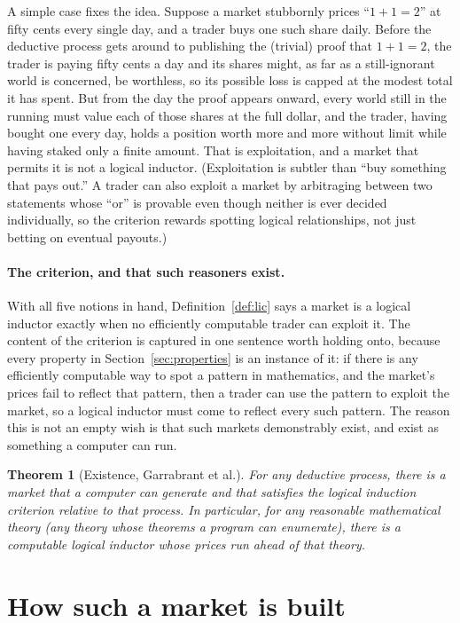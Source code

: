 \documentclass[10pt]{article}
\newtheorem{theorem}{Theorem}[section]
\theoremstyle{definition}
\theoremstyle{remark}
\begin{document}
A simple case fixes the idea. Suppose a market stubbornly prices ``$1+1=2$'' at fifty cents every single day, and a trader buys one such share daily. Before the deductive process gets around to publishing the (trivial) proof that $1+1=2$, the trader is paying fifty cents a day and its shares might, as far as a still-ignorant world is concerned, be worthless, so its possible loss is capped at the modest total it has spent. But from the day the proof appears onward, every world still in the running must value each of those shares at the full dollar, and the trader, having bought one every day, holds a position worth more and more without limit while having staked only a finite amount. That is exploitation, and a market that permits it is not a logical inductor. (Exploitation is subtler than ``buy something that pays out.'' A trader can also exploit a market by arbitraging between two statements whose ``or'' is provable even though neither is ever decided individually, so the criterion rewards spotting logical relationships, not just betting on eventual payouts.)

\paragraph{The criterion, and that such reasoners exist.} With all five notions in hand, Definition~\ref{def:lic} says a market is a logical inductor exactly when no efficiently computable trader can exploit it. The content of the criterion is captured in one sentence worth holding onto, because every property in Section~\ref{sec:properties} is an instance of it: if there is any efficiently computable way to spot a pattern in mathematics, and the market's prices fail to reflect that pattern, then a trader can use the pattern to exploit the market, so a logical inductor must come to reflect every such pattern. The reason this is not an empty wish is that such markets demonstrably exist, and exist as something a computer can run.

\begin{theorem}[Existence, Garrabrant et al.]
\label{thm:existence}
For any deductive process, there is a market that a computer can generate and that satisfies the logical induction criterion relative to that process. In particular, for any reasonable mathematical theory (any theory whose theorems a program can enumerate), there is a computable logical inductor whose prices run ahead of that theory.
\end{theorem}

\section{How such a market is built}
\label{sec:construction}
\end{document}
